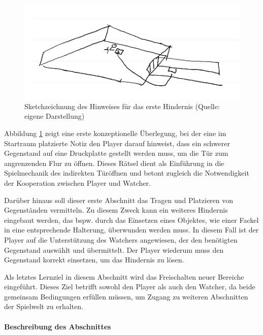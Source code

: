 \begin{figure}[ht]
\centering
\includegraphics[width=1\linewidth]{content/pictures/Startroom_Sketch.png}
\caption{Sketchzeichnung des Hinweises für das erste Hindernis (Quelle: eigene Darstellung)}
\label{fig:sketch-startriddle}
\end{figure}

Abbildung \ref{fig:sketch-startriddle} zeigt eine erste konzeptionelle Überlegung, bei der eine im Startraum platzierte Notiz den Player darauf hinweist, dass ein schwerer Gegenstand auf eine Druckplatte gestellt werden muss, um die Tür zum angrenzenden Flur zu öffnen. Dieses Rätsel dient als Einführung in die Spielmechanik des indirekten Türöffnen und betont zugleich die Notwendigkeit der Kooperation zwischen Player und Watcher.

Darüber hinaus soll dieser erste Abschnitt das Tragen und Platzieren von Gegenständen vermitteln. Zu diesem Zweck kann ein weiteres Hindernis eingebaut werden, das bspw. durch das Einsetzen eines Objektes, wie einer Fackel in eine entsprechende Halterung, überwunden werden muss. In diesem Fall ist der Player auf die Unterstützung des Watchers angewiesen, der den benötigten Gegenstand auswählt und übermittelt. Der Player wiederum muss den Gegenstand korrekt einsetzen, um das Hindernis zu lösen.

Als letztes Lernziel in diesem Abschnitt wird das Freischalten neuer Bereiche eingeführt. Dieses Ziel betrifft sowohl den Player als auch den Watcher, da beide gemeinsam Bedingungen erfüllen müssen, um Zugang zu weiteren Abschnitten der Spielwelt zu erhalten.

\paragraph{Beschreibung des Abschnittes}

